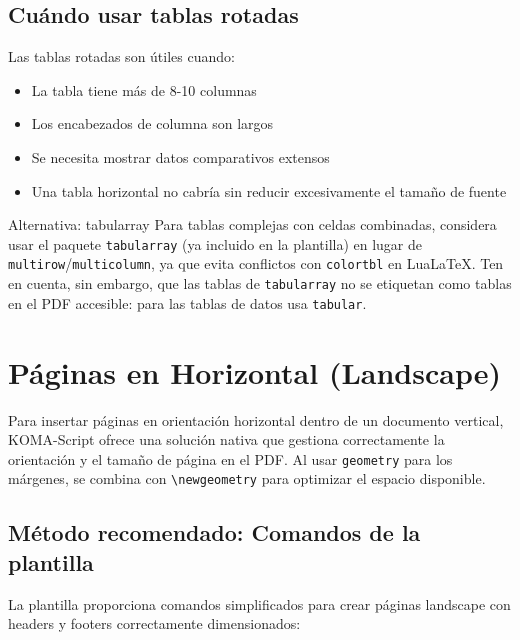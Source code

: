 \subsection{Cuándo usar tablas rotadas}
\label{subsec:cuando-tablas-rotadas}

Las tablas rotadas son útiles cuando:
\begin{itemize}
  \item La tabla tiene más de 8-10 columnas
  \item Los encabezados de columna son largos
  \item Se necesita mostrar datos comparativos extensos
  \item Una tabla horizontal no cabría sin reducir excesivamente el tamaño de fuente
\end{itemize}

\begin{tipbox}{Alternativa: tabularray}
  Para tablas complejas con celdas combinadas, considera usar el paquete
  \texttt{tabularray} (ya incluido en la plantilla) en lugar de
  \texttt{multirow}/\texttt{multicolumn}, ya que evita conflictos con
  \texttt{colortbl} en LuaLaTeX. Ten en cuenta, sin embargo, que las tablas
  de \texttt{tabularray} no se etiquetan como tablas en el PDF accesible:
  para las tablas de datos usa \texttt{tabular}.
\end{tipbox}

\section{Páginas en Horizontal (Landscape)}
\label{sec:paginas-landscape}

Para insertar páginas en orientación horizontal dentro de un documento vertical,
KOMA-Script ofrece una solución nativa que gestiona correctamente la orientación
y el tamaño de página en el PDF. Al usar \texttt{geometry} para los márgenes,
se combina con \verb|\newgeometry| para optimizar el espacio disponible.

\subsection{Método recomendado: Comandos de la plantilla}
\label{subsec:comandos-landscape}

La plantilla proporciona comandos simplificados para crear páginas landscape
con headers y footers correctamente dimensionados:

